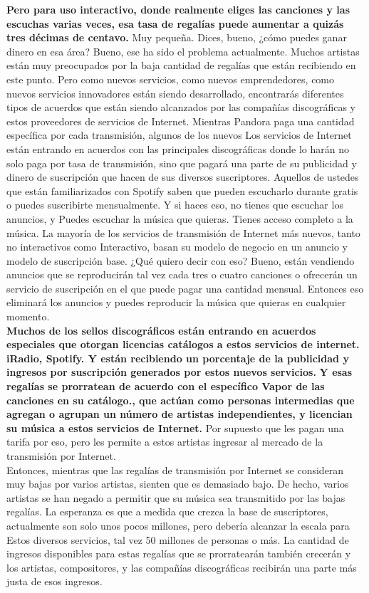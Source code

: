 \documentclass[10pt]{book}
\begin{document}
\textbf{Pero para uso interactivo, donde realmente eliges las canciones y las escuchas varias veces, esa tasa de regalías puede aumentar a quizás tres décimas de centavo.} Muy pequeña. Dices, bueno, ¿cómo puedes ganar dinero en esa área? Bueno, ese ha sido el problema actualmente. Muchos artistas están muy preocupados por la baja cantidad de regalías que están recibiendo en este punto. Pero como nuevos servicios, como nuevos emprendedores, como nuevos servicios innovadores están siendo desarrollado, encontrarás diferentes tipos de acuerdos que están siendo alcanzados por las compañías discográficas y estos proveedores de servicios de Internet. Mientras Pandora paga una cantidad específica por cada transmisión, algunos de los nuevos Los servicios de Internet están entrando en acuerdos con las principales discográficas donde lo harán no solo paga por tasa de transmisión, sino que pagará una parte de su publicidad y dinero de suscripción que hacen de sus diversos suscriptores. Aquellos de ustedes que están familiarizados con Spotify saben que pueden escucharlo durante gratis o puedes suscribirte mensualmente. Y si haces eso, no tienes que escuchar los anuncios, y Puedes escuchar la música que quieras. Tienes acceso completo a la música. La mayoría de los servicios de transmisión de Internet más nuevos, tanto no interactivos como Interactivo, basan su modelo de negocio en un anuncio y modelo de suscripción base. ¿Qué quiero decir con eso? Bueno, están vendiendo anuncios que se reproducirán tal vez cada tres o cuatro canciones o ofrecerán un servicio de suscripción en el que puede pagar una cantidad mensual. Entonces eso eliminará los anuncios y puedes reproducir la música que quieras en cualquier momento.\\
\textbf{Muchos de los sellos discográficos están entrando en acuerdos especiales que otorgan licencias catálogos a estos servicios de internet. iRadio, Spotify. Y están recibiendo un porcentaje de la publicidad y ingresos por suscripción generados por estos nuevos servicios.} \textbf{Y esas regalías se prorratean de acuerdo con el específico Vapor de las canciones en su catálogo., que actúan como personas intermedias que agregan o agrupan un número de artistas independientes, y licencian su música a estos servicios de Internet.} Por supuesto que les pagan una tarifa por eso, pero les permite a estos artistas ingresar al mercado de la transmisión por Internet.\\
Entonces, mientras que las regalías de transmisión por Internet se consideran muy bajas por varios artistas, sienten que es demasiado bajo. De hecho, varios artistas se han negado a permitir que su música sea transmitido por las bajas regalías. La esperanza es que a medida que crezca la base de suscriptores, actualmente son solo unos pocos millones, pero debería alcanzar la escala para Estos diversos servicios, tal vez 50 millones de personas o más. La cantidad de ingresos disponibles para estas regalías que se prorratearán también crecerán y los artistas, compositores, y las compañías discográficas recibirán una parte más justa de esos ingresos.\\
\end{document}
